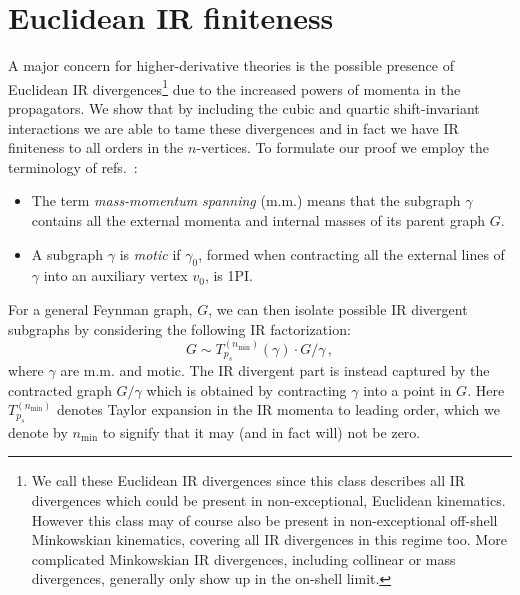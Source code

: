\documentclass[a4paper,11pt]{article}
\begin{document}
\section{Euclidean IR finiteness}\label{sec:IRfiniteness}
A major concern for higher-derivative theories is the possible presence of Euclidean IR divergences\footnote{We call these Euclidean IR divergences since this class describes all IR divergences which could be present in non-exceptional, Euclidean kinematics. However this class may of course also be present in non-exceptional off-shell Minkowskian kinematics, covering all IR divergences in this regime too. More complicated Minkowskian IR divergences, including collinear or mass divergences, generally only show up in the on-shell limit.}  due to the increased powers of momenta in the propagators. We show that by including the cubic and quartic shift-invariant interactions we are able to tame these divergences and in fact we have IR finiteness to all orders in the $n$-vertices. To formulate our proof we employ the terminology of refs.~\cite{Brown:2015fyf,Beekveldt:2020kzk}:
\begin{itemize}
    \item The term \emph{mass-momentum spanning} (m.m.) means that the subgraph $\gamma$ contains all the external momenta and internal masses of its parent graph $G$. 
    \item A subgraph $\gamma$ is \emph{motic} if $\gamma_0$, formed when contracting all the external lines of $\gamma$ into an auxiliary vertex $v_0$, is 1PI.  
\end{itemize}

For a general Feynman graph, $G$, we can then isolate possible IR divergent subgraphs by considering the following IR factorization: 
\begin{equation}\label{eq:softfactorization}
    G \sim T_{p_s}^{(n_\mathrm{min})}(\gamma) \cdot G/\gamma \,,
\end{equation}
where $\gamma$ are m.m. and motic. The IR divergent part is instead captured by the contracted graph $G/\gamma$ which is obtained by contracting $\gamma$ into a point in $G$. Here 
$ T_{p_s}^{(n_\mathrm{min})}$ denotes Taylor expansion in the IR momenta to leading order, which we denote by $n_\mathrm{min}$ to signify that it may (and in fact will) not be zero. 
\end{document}
